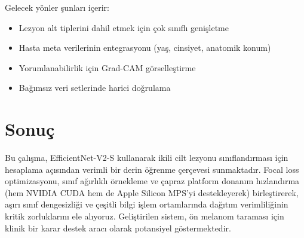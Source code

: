 \documentclass[12pt,a4paper]{article}
\begin{document}
Gelecek yönler şunları içerir:
\begin{itemize}
    \item Lezyon alt tiplerini dahil etmek için çok sınıflı genişletme
    \item Hasta meta verilerinin entegrasyonu (yaş, cinsiyet, anatomik konum)
    \item Yorumlanabilirlik için Grad-CAM görselleştirme
    \item Bağımsız veri setlerinde harici doğrulama
\end{itemize}

\section{Sonuç}
\label{sec:conclusion}

Bu çalışma, EfficientNet-V2-S kullanarak ikili cilt lezyonu sınıflandırması için hesaplama açısından verimli bir derin öğrenme çerçevesi sunmaktadır. Focal loss optimizasyonu, sınıf ağırlıklı örnekleme ve çapraz platform donanım hızlandırma (hem NVIDIA CUDA hem de Apple Silicon MPS'yi destekleyerek) birleştirerek, aşırı sınıf dengesizliği ve çeşitli bilgi işlem ortamlarında dağıtım verimliliğinin kritik zorluklarını ele alıyoruz. Geliştirilen sistem, ön melanom taraması için klinik bir karar destek aracı olarak potansiyel göstermektedir.

\newpage
\end{document}
